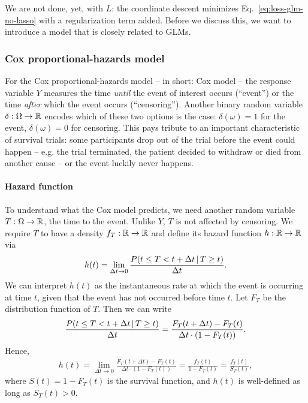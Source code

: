 We are not done, yet, with $L$: the coordinate descent minimizes 
Eq.\ \eqref{eq:loss-glm-no-lasso} with a regularization term added. Before we discuss this, we want 
to introduce a model that is closely related to GLMs.

\subsubsection{Cox proportional-hazards model}\label{subsubsec:cox}

For the Cox proportional-hazards model -- in short: Cox model -- the response variable $Y$ 
measures the time \textit{until} the event of interest occurs (``event'') or the time 
\textit{after} which the event occurs (``censoring''). Another binary random variable 
$\delta: \Omega \to \mathbb{R}$ encodes 
which of these two options is the case: $\delta(\omega) = 1$ for the event, $\delta(\omega) = 0$ 
for censoring. This pays tribute to an important characteristic of survival trials: some
participants drop out of the trial before the event could happen -- e.g. the trial terminated, the 
patient decided to withdraw or died from another cause -- or the event luckily never happens.

\paragraph{Hazard function} To understand what the Cox model predicts, we need another random 
variable $T: \Omega \to \mathbb{R}$, the time to the event. Unlike $Y$, $T$ is not affected by censoring. 
We require $T$ to have a density $f_T: \mathbb{R} \to \mathbb{R}$ and define its hazard function $h: \mathbb{R} \to \mathbb{R}$
via
\begin{align}
    h(t) = \lim_{\Delta t \to 0} \frac{P(t \leq T < t + \Delta t \,|\, T \geq t)}{\Delta t}.
\end{align}
We can interpret $h(t)$ as the instantaneous rate at which the event is occurring at time $t$, 
given that the event has not occurred before time $t$. Let $F_T$ be the distribution function of 
$T$. Then 
we can write
\begin{align}
    \frac{P(t \leq T < t + \Delta t \,|\, T \geq t)}{\Delta t} = 
    \frac{F_T(t + \Delta t) - F_T(t)}{\Delta t \cdot (1 - F_T(t))}.
\end{align}
Hence, 
\begin{align}
    h(t) = \lim_{\Delta t \to 0} \frac{F_T(t + \Delta t) - F_T(t)}{\Delta t \cdot (1 - F_T(t))} 
    = \frac{f_T(t)}{1 - F_T(t)} = \frac{f_T(t)}{S_T(t)},
\end{align}
where $S(t) = 1 - F_T(t)$ is the survival function, and $h(t)$ is well-defined as long as $S_T(t)
> 0$.

